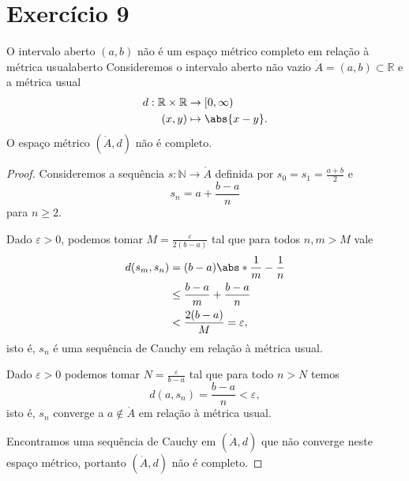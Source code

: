 \section*{Exercício 9}

\begin{proposition}{O intervalo aberto \((a,b)\) não é um espaço métrico completo em relação à métrica usual}{aberto}
    Consideremos o intervalo aberto não vazio \(\mathring{A} = (a,b) \subset \mathbb{R}\) e a métrica usual
    \begin{align*}
        d : \mathbb{R} \times \mathbb{R} &\to [0, \infty)\\
                                   (x,y) &\mapsto \abs{x - y}.
    \end{align*}
    O espaço métrico \((\mathring{A}, d)\) não é completo.
\end{proposition}
\begin{proof}
    Consideremos a sequência \(s : \mathbb{N} \to \mathring{A}\) definida por \(s_0 = s_1 = \frac{a+b}{2}\) e
    \begin{equation*}
        s_n = a + \frac{b - a}{n}
    \end{equation*}
    para \(n \geq 2\).

    Dado \(\varepsilon > 0\), podemos tomar \(M = \frac{\varepsilon}{2(b - a)}\) tal que para todos \(n,m > M\) vale
    \begin{align*}
        d(s_m, s_n) &= (b - a) \abs*{\frac{1}{m} - \frac{1}{n}}\\
                    &\leq \frac{b - a}{m} + \frac{b - a}{n}\\
                    &< \frac{2(b - a)}{M} = \varepsilon,
    \end{align*}
    isto é, \(s_n\) é uma sequência de Cauchy em relação à métrica usual.


    Dado \(\varepsilon > 0\) podemos tomar \(N = \frac{\varepsilon}{b - a}\) tal que para todo \(n > N\) temos
    \begin{equation*}
        d(a, s_n) = \frac{b - a}{n} < \varepsilon,
    \end{equation*}
    isto é, \(s_n\) converge a \(a \notin \mathring{A}\) em relação à métrica usual.

    Encontramos uma sequência de Cauchy em \((\mathring{A}, d)\) que não converge neste espaço métrico, portanto \((\mathring{A},d)\) não é completo.
\end{proof}

